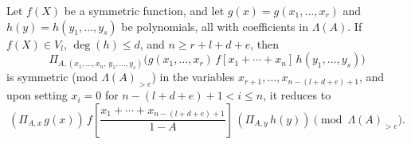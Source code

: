 \documentclass[10pt,a4paper]{amsart}
\begin{document}
\begin{thm}\label{thm:PiA-symm}
Let $f(X)$ be a symmetric function, and let $g(x) =
g(x_{1},\ldots,x_{r})$ and $h(y) = h(y_{1},\ldots,y_{s})$ be
polynomials, all with coefficients in $\Lambda (A)$.  If $f(X)\in
V_{l}$, $\deg (h)\leq d$, and $n\geq r+l+d+e$, then
\begin{equation}\label{e:PiA-symm-in}
\Pi _{A,(x_{1}, \ldots, x_{n},\, y_{1},\ldots,y_{s})}
\bigl(g(x_{1},\ldots,x_{r})\, f[x_{1}+\cdots +x_{n}] \,
h(y_{1},\ldots,y_{s})\bigr)
\end{equation}
is symmetric {\rm (mod $\Lambda (A)_{>e}$)} in the variables
$x_{r+1},\ldots,x_{n-(l+d+e)+1}$, and upon setting $x_{i} = 0$ for
$n-(l+d+e)+1<i\leq n$, it reduces to
\begin{equation}\label{e:PiA-symm-out}
(\Pi _{A,x}\, g(x))\, f \! \left[\frac{x_{1}+\cdots
+x_{n-(l+d+e)+1}}{1-A} \right]\, (\Pi _{A,y}\, h(y)) \pmod{\Lambda
(A)_{>e}}.
\end{equation}
\end{thm}
\end{document}
